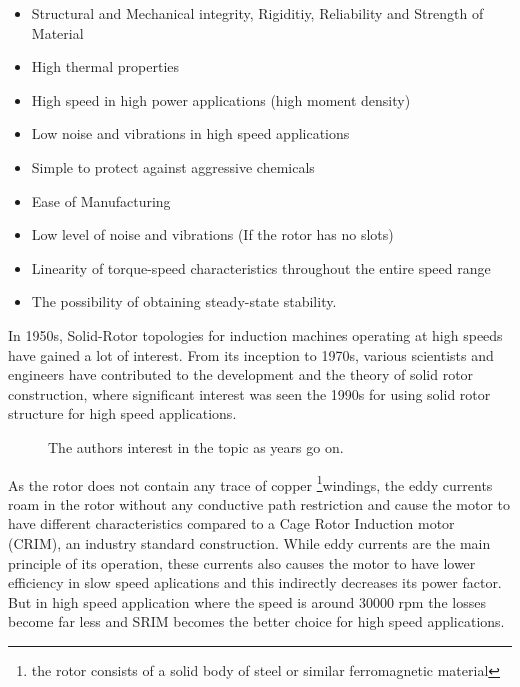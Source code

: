 \begin{itemize}
\item Structural and Mechanical integrity, Rigiditiy, Reliability and Strength of
  Material
\item High thermal properties
\item High speed in high power applications (high moment density)
\item Low noise and vibrations in high speed applications
\item Simple to protect against aggressive chemicals
\item Ease of Manufacturing
\item Low level of noise and vibrations (If the rotor has no slots)
\item Linearity of torque-speed characteristics throughout the entire speed range
\item The possibility of obtaining steady-state stability.
\end{itemize}

In 1950s, Solid-Rotor topologies for induction machines operating at high speeds
have gained a lot of interest. From its inception to 1970s, various scientists and engineers
have contributed to the development and the theory of solid rotor construction, where significant
interest was seen the 1990s for using solid rotor structure for high speed applications.

\begin{figure}[!t]
  \caption{The authors interest in the topic as years go on.}
  
\end{figure}

As the rotor does not contain any trace of copper \footnote{the rotor
  consists of a solid body of steel or similar ferromagnetic material}{windings}, the eddy currents
roam in the rotor without any conductive path restriction and cause the motor to
have different characteristics compared to a Cage Rotor Induction motor (CRIM), an industry standard
construction.
While eddy currents are the main principle of its operation, these currents also causes
the motor to have lower efficiency in slow speed aplications and this indirectly
decreases its power factor. But in high speed application where the speed is
around 30000 rpm the losses become far less and SRIM becomes the better choice for high speed
applications.


